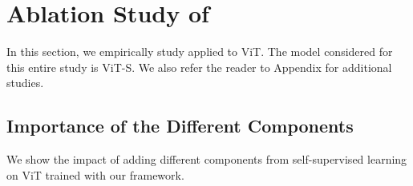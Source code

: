 \section{Ablation Study of \OURS}
In this section, we empirically study \OURS applied to ViT.
The model considered for this entire study is ViT-S.
We also refer the reader to Appendix for additional studies.

\subsection{Importance of the Different Components}
\label{sec:comp}
We show the impact of adding different components from self-supervised learning on ViT trained with our framework. 

